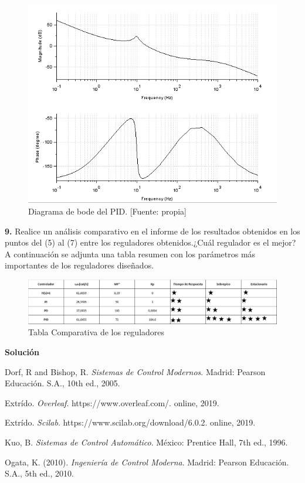 \documentclass[12pt,letterpaper]{article}
\begin{document}
\begin{figure}[hbtp]
	\centering
	\includegraphics[width = .75 \columnwidth]{bodePID.png} 
	\caption[Figura7]{Diagrama de bode del PID. [Fuente: propia]} 
	\label{fig:fig10} 
\end{figure}

\bigskip

\bigskip


\textbf{9.} Realice un análisis comparativo en el informe de los resultados obtenidos en los puntos del (5) al (7) entre los reguladores obtenidos.¿Cuál regulador es el mejor?\\

A continuación se adjunta una tabla resumen con los parámetros más importantes de los reguladores diseñados.


\begin{figure}[hbtp]
	\centering
	\includegraphics[width = .75 \columnwidth]{tabla.jpg} 
	\caption[Figura7]{Tabla Comparativa de los reguladores} 
	\label{fig:fig10} 
\end{figure}
 

\bigskip

\textbf{Solución}

\bigskip

\begin{thebibliography}{1}
Dorf, R and Bishop, R. \emph{Sistemas de Control Modernos}. Madrid: Pearson Educación. S.A., 10th ed., 2005.

Extrído. \emph{Overleaf}. https://www.overleaf.com/. online, 2019.

Extrído. \emph{Scilab}. https://www.scilab.org/download/6.0.2. online, 2019.

Kuo, B. \emph{Sistemas de Control Automático}. México: Prentice Hall, 7th ed., 1996.

Ogata, K. (2010). \emph{Ingeniería de Control Moderna}. Madrid: Pearson Educación. S.A., 5th ed., 2010.

\end{thebibliography}


\nocite{*}


\end{document}
